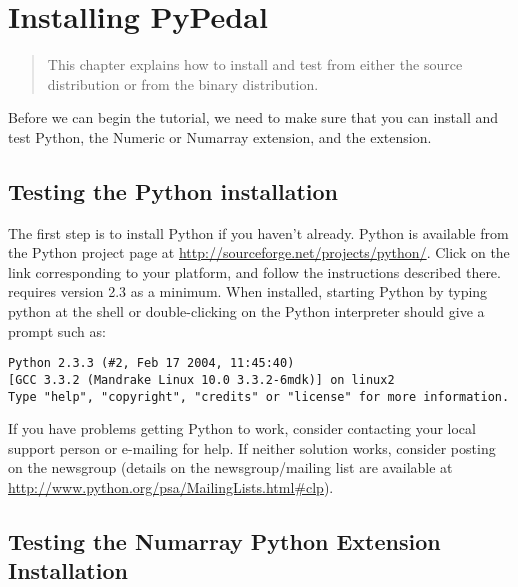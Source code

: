 \chapter{Installing PyPedal}
\label{cha:installation}

\begin{quote}
   This chapter explains how to install and test \PYPEDAL{} from either the source distribution or from the binary distribution.
\end{quote}

Before we can begin the tutorial, we need to make sure that you can install and test Python, the Numeric or Numarray extension, and the \PYPEDAL{} extension.

\section{Testing the Python installation}

The first step is to install Python if you haven't already. Python is available from the Python project page at \url{http://sourceforge.net/projects/python/}.  Click on the link corresponding to your platform, and follow the instructions
described there. \PYPEDAL{} requires version 2.3 as a minimum.  When installed, starting Python by typing python at the shell or double-clicking on the Python interpreter should give a prompt such as:
\begin{verbatim}
Python 2.3.3 (#2, Feb 17 2004, 11:45:40)
[GCC 3.3.2 (Mandrake Linux 10.0 3.3.2-6mdk)] on linux2
Type "help", "copyright", "credits" or "license" for more information.
\end{verbatim}
If you have problems getting Python to work, consider contacting your local support person or e-mailing  for help. If neither solution works, consider posting on the
 newsgroup (details on the newsgroup/mailing list are available at
\url{http://www.python.org/psa/MailingLists.html\#clp}).


\section{Testing the Numarray Python Extension Installation}

